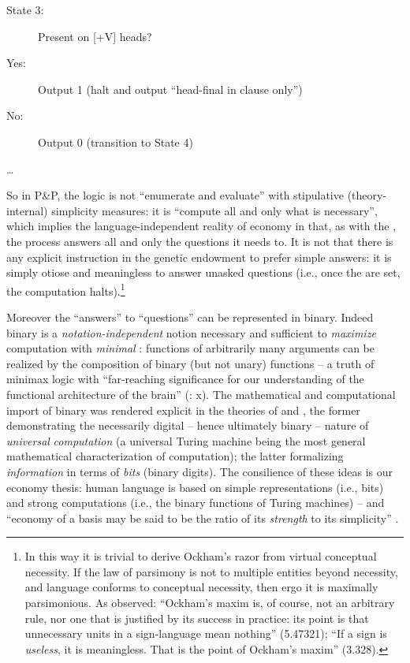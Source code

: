 \documentclass[output=paper]{langsci/langscibook}
\begin{document}
 \begin{description}
\item[State 3:] Present on [+V] heads?
\item[Yes:] Output 1 (halt and output “head-final in clause only”)
\item[No:] Output 0 (transition to State 4)
 \end{description}

     \dots{}
\z

So in P\&P, the logic is not “enumerate and evaluate” with stipulative
(theory-internal) simplicity measures: it is “compute all and only what is
necessary”, which implies the language-independent reality of economy in that,
as with the , the process answers all and only the
questions it needs to. It is not that there is any explicit instruction in the
genetic endowment to prefer simple answers: it is simply otiose and meaningless
to answer unasked questions (i.e., once the  are set, the computation
halts).\footnote{In this way it is trivial to derive Ockham’s razor from virtual
conceptual necessity. If the law of parsimony is not to multiple entities
beyond necessity, and language conforms to conceptual necessity, then ergo it
is maximally parsimonious. As \citet{Wittgenstein1922} observed: “Ockham’s
maxim is, of course, not an arbitrary rule, nor one that is justified by its
success in practice: its point is that unnecessary units in a sign-language
mean nothing” (5.47321); “If a sign is \emph{useless}, it is meaningless. That
is the point of Ockham’s maxim” (3.328).}\largerpage

Moreover the “answers” to “questions” can be represented in binary. Indeed
binary is a \emph{notation-independent} notion necessary and sufficient to
\emph{maximize} computation with \emph{minimal} : functions of
arbitrarily many arguments can be realized by the composition of binary (but
not unary) functions – a truth of minimax logic with “far-reaching significance
for our understanding of the functional architecture of the brain”
(\citealt{GallistelKing2010}: x). The mathematical and computational
import of binary was rendered explicit in the theories of \citet{Turing1936}
and \citet{Shannon1948}, the former demonstrating the necessarily digital –
hence ultimately binary – nature of \emph{universal} \emph{computation} (a
universal Turing machine being the most general mathematical characterization
of computation); the latter formalizing \emph{information} in terms of
\emph{bits} (binary digits). The consilience of these ideas is our economy
thesis: human language is based on simple representations (i.e., bits) and
strong computations (i.e., the binary functions of Turing machines) – and
“economy of a basis may be said to be the ratio of its \emph{strength} to its
simplicity” \citep[111]{Goodman1943}.
\end{document}
